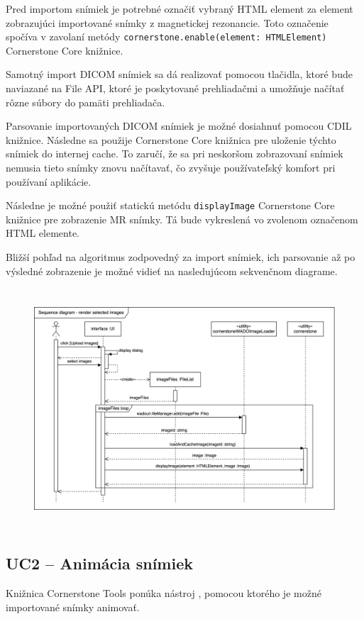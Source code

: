 Pred importom snímiek je potrebné označiť vybraný HTML element za element zobrazujúci importované snímky z magnetickej rezonancie. Toto označenie spočíva v zavolaní metódy \texttt{cornerstone.enable(element: HTMLElement)} Cornerstone Core knižnice.

\clearpage

Samotný import DICOM snímiek sa dá realizovať pomocou tlačidla, ktoré bude naviazané na File API, ktoré je poskytované prehliadačmi a umožňuje načítať rôzne súbory do pamäti prehliadača.

Parsovanie importovaných DICOM snímiek je možné dosiahnuť pomocou CDIL knižnice. Následne sa použije Cornerstone Core knižnica pre uloženie týchto snímiek do internej cache. To zaručí, že sa pri neskoršom zobrazovaní snímiek nemusia tieto snímky znovu načítavať, čo zvyšuje používateľský komfort pri používaní aplikácie.

Následne je možné použiť statickú metódu \texttt{displayImage} Cornerstone Core knižnice pre zobrazenie MR snímky. Tá bude vykreslená vo zvolenom označenom HTML elemente.

Bližší pohľad na algoritmus zodpovedný za import snímiek, ich parsovanie až po výsledné zobrazenie je možné vidieť na nasledujúcom sekvenčnom diagrame.

\begin {figure}[H]
        \centering
        \includegraphics[height=9cm]{media/graphs/render_images.png}
        \captionsetup{justification=centering}
\end {figure}

\subsection {UC2 -- Animácia snímiek}
Knižnica Cornerstone Tools ponúka nástroj , pomocou ktorého je možné importované snímky animovať.

